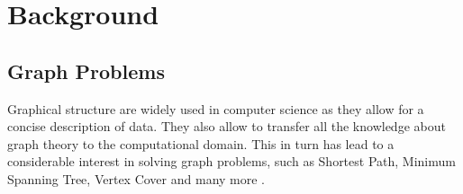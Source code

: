\section{Background}
\subsection{Graph Problems}
Graphical structure are widely used in computer science as they allow for a concise description of data. They also allow to transfer all the knowledge about graph theory to the computational domain. This in turn has lead to a considerable interest in solving graph problems, such as Shortest Path, Minimum Spanning Tree, Vertex Cover and many more \citep{Shrinivas2010}. 